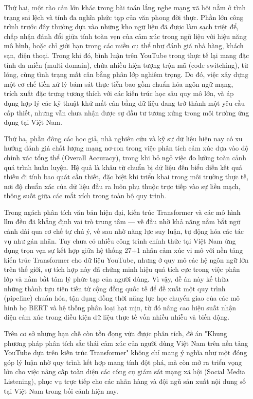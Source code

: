 Thứ hai, một rào cản lớn khác trong bài toán lắng nghe mạng xã hội nằm ở tình trạng sai lệch và tính đa nghĩa phức tạp của văn phong đời thực. Phần lớn công trình trước đây thường dựa vào những kho ngữ liệu đã được làm sạch triệt để, chấp nhận đánh đổi giữa tính toàn vẹn của cảm xúc trong ngữ liệu với hiệu năng mô hình, hoặc chỉ giới hạn trong các miền cụ thể như đánh giá nhà hàng, khách sạn, điện thoại. Trong khi đó, bình luận trên YouTube trong thực tế lại mang đặc tính đa miền (multi-domain), chứa nhiều hiện tượng trộn mã (code-switching), từ lóng, cùng tình trạng mất cân bằng phân lớp nghiêm trọng. Do đó, việc xây dựng một cơ chế tiền xử lý bám sát thực tiễn bao gồm chuẩn hóa ngôn ngữ mạng, trích xuất đặc trưng tương thích với các kiến trúc học sâu quy mô lớn, và áp dụng hợp lý các kỹ thuật khử mất cân bằng dữ liệu đang trở thành một yêu cầu cấp thiết, nhưng vẫn chưa nhận được sự đầu tư tương xứng trong môi trường ứng dụng tại Việt Nam.

Thứ ba, phần đông các học giả, nhà nghiên cứu và kỹ sư dữ liệu hiện nay có xu hướng đánh giá chất lượng mạng nơ-ron trong việc phân tích cảm xúc dựa vào độ chính xác tổng thể (Overall Accuracy), trong khi bỏ ngỏ việc đo lường toàn cảnh quá trình huấn luyện. Hệ quả là khâu từ chuẩn bị dữ liệu đến biểu diễn kết quả thiếu đi tính bao quát cần thiết, đặc biệt khi triển khai trong môi trường thực tế, nơi độ chuẩn xác của dữ liệu đầu ra luôn phụ thuộc trực tiếp vào sự liền mạch, thông suốt giữa các mắt xích trong toàn bộ quy trình.

Trong ngách phân tích văn bản hiện đại, kiến trúc Transformer \parencite{vaswani2017attention} và các mô hình \acrshort{llm} đều đã khẳng định vai trò trung tâm — vế đầu nhờ khả năng nắm bắt ngữ cảnh dài qua cơ chế tự chú ý, vế sau nhờ năng lực suy luận, tự động hóa các tác vụ như gán nhãn. Tuy chưa có nhiều công trình chính thức tại Việt Nam ứng dụng trọn vẹn sự kết hợp giữa hệ thống 27+1 nhãn cảm xúc vi mô với nền tảng kiến trúc Transformer cho dữ liệu YouTube, nhưng ở quy mô các hệ ngôn ngữ lớn trên thế giới, sự tích hợp này đã chứng minh hiệu quả tích cực trong việc phân lớp và nắm bắt tâm lý phức tạp của người dùng. Vì vậy, đề án này kế thừa những thành tựu tiên tiến từ cộng đồng quốc tế để đề xuất một quy trình (pipeline) chuẩn hóa, tận dụng đồng thời năng lực học chuyển giao của các mô hình họ BERT và hệ thống phân loại hạt mịn, từ đó nâng cao hiệu suất nhận diện cảm xúc trong điều kiện dữ liệu thực tế vốn nhiều nhiễu và biến động.

Trên cơ sở những hạn chế còn tồn đọng vừa được phân tích, đề án "Khung phương pháp phân tích sắc thái cảm xúc của người dùng Việt Nam trên nền tảng YouTube dựa trên kiến trúc Transformer" không chỉ mang ý nghĩa như một đóng góp lý luận nhờ quy trình kết hợp mang tính đột phá, mà còn mở ra triển vọng lớn cho việc nâng cấp toàn diện các công cụ giám sát mạng xã hội (Social Media Listening), phục vụ trực tiếp cho các nhãn hàng và đội ngũ sản xuất nội dung số tại Việt Nam trong bối cảnh hiện nay.
